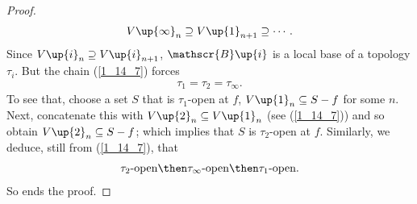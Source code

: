 \begin{proof}
\begin{align}
    V\up{\infty}_n 
      \supseteq  
    V\up{1}_{n+1} 
      \supseteq  
    \cdots .
  \end{align}
%
Since 
  $V\up{i}_n\supseteq  V\up{i}_{n+1}$, 
$\mathscr{B}\up{i}$ is a local base of a topology $\tau_i$. 
But the chain (\ref{1_14_7}) forces %
%
  \begin{align}
    \tau_1 = \tau_2 = \tau_\infty.
  \end{align}
%
To see that, choose a set $S$ that is $\tau_1$-open at $f$, \ie 
%
  $V\up{1}_n \subseteq S-f$  
%
for some $n$. Next, concatenate this with %
%
  $V\up{2}_n \subseteq V\up{1}_n$ (see (\ref{1_14_7})) %
%
and so obtain  
%
  $V\up{2}_n \subseteq S-f$; 
%
which implies that $S$ is $\tau_2$-open at $f$.
Similarly, we deduce, still from (\ref{1_14_7}), that 
\begin{align}
  \tau_2\text{-open} 
    \then 
  \tau_\infty\text{-open} 
    \then 
  \tau_1\text{-open}.
\end{align}
So ends the proof.
\end{proof}






